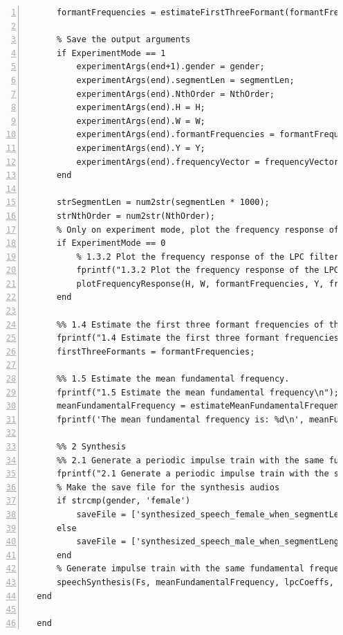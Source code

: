\documentclass{article}
\begin{document}
\begin{lstlisting}[frame=single, numbers=left, style=Matlab-editor, caption={mainFunction.m}, label={lst:mainFunction}]
      % Get the first three formant frequencies of the vowel and plot them
      formantFrequencies = estimateFirstThreeFormant(formantFrequencies);
  
      % Save the output arguments
      if ExperimentMode == 1
          experimentArgs(end+1).gender = gender;
          experimentArgs(end).segmentLen = segmentLen;
          experimentArgs(end).NthOrder = NthOrder;
          experimentArgs(end).H = H;
          experimentArgs(end).W = W;
          experimentArgs(end).formantFrequencies = formantFrequencies;
          experimentArgs(end).Y = Y;
          experimentArgs(end).frequencyVector = frequencyVector;
      end
  
      strSegmentLen = num2str(segmentLen * 1000);
      strNthOrder = num2str(NthOrder);
      % Only on experiment mode, plot the frequency response of the LPC filter
      if ExperimentMode == 0
          % 1.3.2 Plot the frequency response of the LPC filter
          fprintf("1.3.2 Plot the frequency response of the LPC filter\n");
          plotFrequencyResponse(H, W, formantFrequencies, Y, frequencyVector, strSegmentLen, strNthOrder, gender);
      end
  
      %% 1.4 Estimate the first three formant frequencies of the vowel
      fprintf("1.4 Estimate the first three formant frequencies of the vowel\n");
      firstThreeFormants = formantFrequencies;
  
      %% 1.5 Estimate the mean fundamental frequency.
      fprintf("1.5 Estimate the mean fundamental frequency\n");
      meanFundamentalFrequency = estimateMeanFundamentalFrequency(segment, Fs, gender);
      fprintf('The mean fundamental frequency is: %d\n', meanFundamentalFrequency);
  
      %% 2 Synthesis
      %% 2.1 Generate a periodic impulse train with the same fundamental frequency
      fprintf("2.1 Generate a periodic impulse train with the same fundamental frequency\n");
      % Make the save file for the synthesis audios
      if strcmp(gender, 'female')
          saveFile = ['synthesized_speech_female_when_segmentLength_', strSegmentLen, '_Order_', strNthOrder, '.wav'];
      else
          saveFile = ['synthesized_speech_male_when_segmentLength_', strSegmentLen, '_Order_', strNthOrder, '.wav'];
      end
      % Generate impulse train with the same fundamental frequency as the original vowel segment
      speechSynthesis(Fs, meanFundamentalFrequency, lpcCoeffs, saveFile); 
  end

  end

\end{lstlisting}
\end{document}
